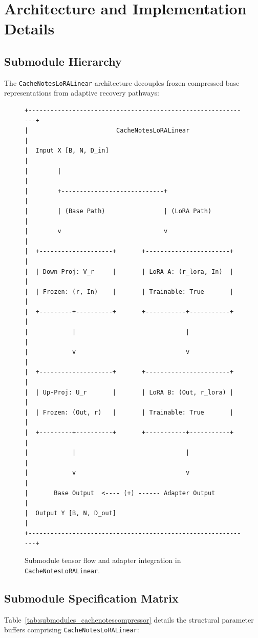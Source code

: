 \section{Architecture and Implementation Details}

\subsection{Submodule Hierarchy}
The \texttt{CacheNotesLoRALinear} architecture decouples frozen compressed base representations from adaptive recovery pathways:

\begin{figure}[H]
\centering
\begin{verbatim}
+-------------------------------------------------------------+
|                        CacheNotesLoRALinear                 |
|  Input X [B, N, D_in]                                       |
|        |                                                    |
|        +----------------------------+                       |
|        | (Base Path)                | (LoRA Path)           |
|        v                            v                       |
|  +--------------------+       +-----------------------+     |
|  | Down-Proj: V_r     |       | LoRA A: (r_lora, In)  |     |
|  | Frozen: (r, In)    |       | Trainable: True       |     |
|  +---------+----------+       +-----------+-----------+     |
|            |                              |                 |
|            v                              v                 |
|  +--------------------+       +-----------------------+     |
|  | Up-Proj: U_r       |       | LoRA B: (Out, r_lora) |     |
|  | Frozen: (Out, r)   |       | Trainable: True       |     |
|  +---------+----------+       +-----------+-----------+     |
|            |                              |                 |
|            v                              v                 |
|       Base Output  <---- (+) ------ Adapter Output          |
|  Output Y [B, N, D_out]                                     |
+-------------------------------------------------------------+
\end{verbatim}
\caption{Submodule tensor flow and adapter integration in \texttt{CacheNotesLoRALinear}.}
\end{figure}

\subsection{Submodule Specification Matrix}
Table~\ref{tab:submodules_cachenotescompressor} details the structural parameter buffers comprising \texttt{CacheNotesLoRALinear}:

